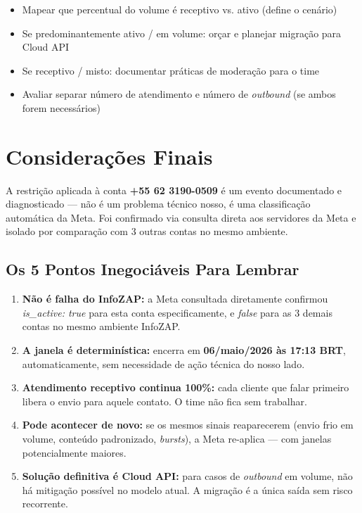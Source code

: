 \documentclass[12pt, a4paper]{article}
\begin{document}
\begin{itemize}[label=$\square$]
    \item Mapear que percentual do volume é receptivo vs. ativo (define o cenário)
    \item Se predominantemente ativo / em volume: orçar e planejar migração para Cloud API
    \item Se receptivo / misto: documentar práticas de moderação para o time
    \item Avaliar separar número de atendimento e número de \textit{outbound} (se ambos forem necessários)
\end{itemize}

\pagebreak

\section{Considerações Finais}

A restrição aplicada à conta \textbf{+55 62 3190-0509} é um evento documentado e diagnosticado --- não é um problema técnico nosso, é uma classificação automática da Meta. Foi confirmado via consulta direta aos servidores da Meta e isolado por comparação com 3 outras contas no mesmo ambiente.

\subsection{Os 5 Pontos Inegociáveis Para Lembrar}

\begin{enumerate}
    \item \textbf{Não é falha do InfoZAP:} a Meta consultada diretamente confirmou \textit{is\_active: true} para esta conta especificamente, e \textit{false} para as 3 demais contas no mesmo ambiente InfoZAP.

    \item \textbf{A janela é determinística:} encerra em \textbf{06/maio/2026 às 17:13 BRT}, automaticamente, sem necessidade de ação técnica do nosso lado.

    \item \textbf{Atendimento receptivo continua 100\%:} cada cliente que falar primeiro libera o envio para aquele contato. O time não fica sem trabalhar.

    \item \textbf{Pode acontecer de novo:} se os mesmos sinais reaparecerem (envio frio em volume, conteúdo padronizado, \textit{bursts}), a Meta re-aplica --- com janelas potencialmente maiores.

    \item \textbf{Solução definitiva é Cloud API:} para casos de \textit{outbound} em volume, não há mitigação possível no modelo atual. A migração é a única saída sem risco recorrente.
\end{enumerate}
\end{document}
